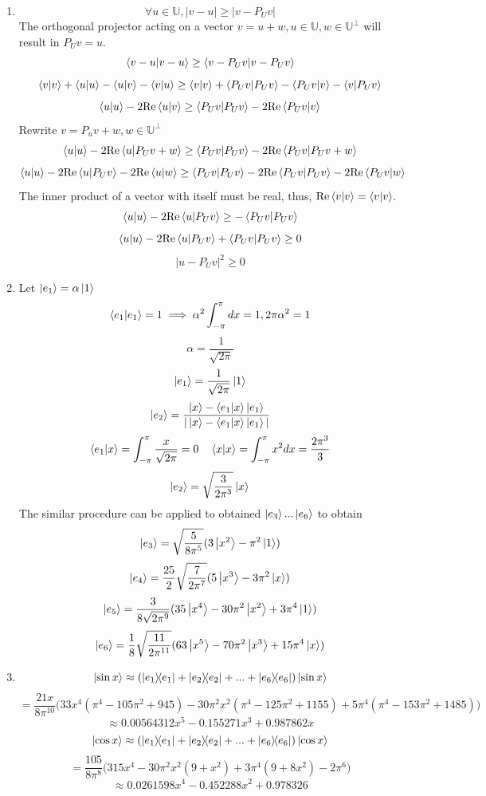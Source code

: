 \begin{sol}
\begin{enumerate}[label=\textbf{(\alph*)}]
\item
$$\forall u\in\mathbb U, |v-u|\geq|v-P_U v|$$ 
The orthogonal projector acting on a vector $v=u+w, u\in\mathbb U, w\in\mathbb U^\perp$ will result in $P_Uv=u$.
$$\braket{v-u}{v-u}\geq\braket{v-P_Uv}{v-P_Uv}$$
$$\braket{v}{v}+\braket{u}{u}-\braket{u}{v}-\braket{v}{u}\geq\braket{v}{v}+\braket{P_Uv}{P_Uv}-\braket{P_Uv}{v}-\braket{v}{P_Uv}$$
$$\braket{u}{u}-2\mathrm{Re}\braket{u}{v}\geq\braket{P_Uv}{P_Uv}-2\mathrm{Re}\braket{P_Uv}{v}$$
Rewrite $v=P_uv+w, w\in\mathbb U^\perp$
$$\braket{u}{u}-2\mathrm{Re}\braket{u}{P_Uv+w}\geq\braket{P_Uv}{P_Uv}-2\mathrm{Re}\braket{P_Uv}{P_Uv+w}$$
$$\braket{u}{u}-2\mathrm{Re}\braket{u}{P_Uv}-2\mathrm{Re}\braket{u}{w}\geq\braket{P_Uv}{P_Uv}-2\mathrm{Re}\braket{P_Uv}{P_Uv}-2\mathrm{Re}\braket{P_Uv}{w}$$
The inner product of a vector with itself must be real, thus, $\mathrm{Re}\braket{v}{v}=\braket{v}{v}$.
$$\braket{u}{u}-2\mathrm{Re}\braket{u}{P_Uv}\geq-\braket{P_Uv}{P_Uv}$$
$$\braket{u}{u}-2\mathrm{Re}\braket{u}{P_Uv}+\braket{P_Uv}{P_Uv}\geq 0$$
$$|u-P_Uv|^2\geq 0$$ 
\item
Let $\ket{e_1}= \alpha\ket{1}$
$$\braket{e_1}{e_1}=1\implies \alpha^2\int_{-\pi}^\pi dx=1, 2\pi\alpha^2=1$$ $$\alpha=\frac{1}{\sqrt{2\pi}}$$ $$\ket{e_1}=\frac{1}{\sqrt{2\pi}}\ket 1$$
$$\ket{e_2}=\frac{\ket x-\braket{e_1}{x} \ket{e_1}}{|\ket x-\braket{e_1}{x} \ket{e_1}|}$$
$$\braket{e_1}{x}=\int_{-\pi}^\pi \frac{x}{\sqrt{2\pi}}=0
\,\,\,\,\,\, \braket{x}{x}=\int_{-\pi}^\pi x^2 dx=\frac{2\pi^3}{3}$$$$\ket{e_2}=\sqrt{\frac{3}{2\pi^3}}\ket x$$ 
The similar procedure can be applied to obtained $\ket{e_3}...\ket{e_6}$ to obtain
$$\ket{e_3}=\sqrt{\frac{5}{8\pi^5}}(3\ket{x^2}-\pi^2\ket 1)$$
$$\ket {e_4}=\frac{25}{2}\sqrt{\frac{7}{2\pi^7}}(5\ket{x^3}-3\pi^2\ket x)$$ $$\ket{e_5}=\frac{3}{8\sqrt{2\pi^9}}(35\ket{x^4}-30\pi^2\ket{x^2}+3\pi^4\ket 1)$$ 
$$\ket{e_6}=\frac{1}{8}\sqrt{\frac{11}{2\pi^{11}}}(63\ket{x^5}-70\pi^2\ket{x^3}+15\pi^4\ket{x})$$ 
\item
$$\ket{\sin x}\approx(\ketbra{e_1}{e_1}+\ketbra{e_2}{e_2}+...+\ketbra{e_6}{e_6})\ket{\sin x}$$ $$=\frac{21x}{8\pi^{10}}\Big(33x^4(\pi^4-105\pi^2+945)-30\pi^2x^2(\pi^4-125\pi^2+1155)+5\pi^4(\pi^4-153\pi^2+1485)\Big)$$
$$\approx 0.00564312x^5-0.155271x^3+0.987862x$$ $$\ket{\cos x}\approx(\ketbra{e_1}{e_1}+\ketbra{e_2}{e_2}+...+\ketbra{e_6}{e_6})\ket{\cos x}$$$$=\frac{105}{8\pi^8}\Big(315 x^4 - 30 \pi^2 x^2 (9 + x^2) + 3 \pi^4 (9 + 8 x^2)-2 \pi^6\Big)$$ $$\approx 0.0261598x^4-0.452288x^2+0.978326$$ 

\end{enumerate}
\end{sol}
